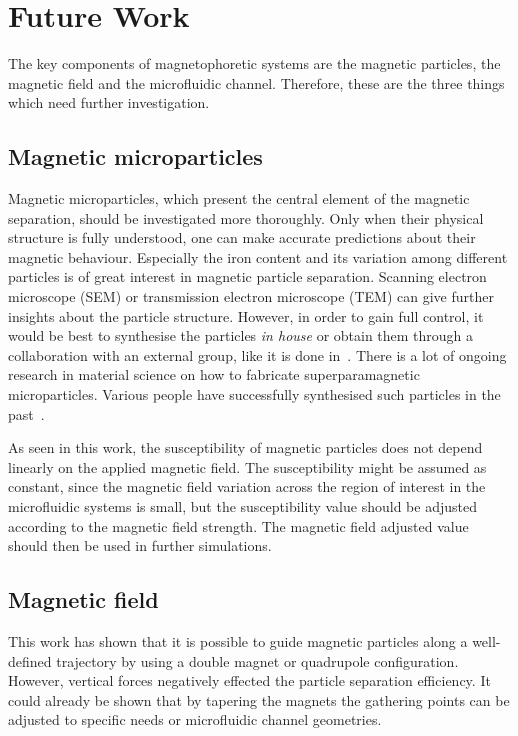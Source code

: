 \section{Future Work}\label{sec:futureWork}

The key components of magnetophoretic systems are the magnetic particles, the magnetic field and the microfluidic channel. Therefore, these are the three things which need further investigation.

\subsection{Magnetic microparticles}
Magnetic microparticles, which present the central element of the magnetic separation, should be investigated more thoroughly. Only when their physical structure is fully understood, one can make accurate predictions about their magnetic behaviour. Especially the iron content and its variation among different particles is of great interest in magnetic particle separation. Scanning electron microscope (SEM) or transmission electron microscope (TEM) can give further insights about the particle structure. However, in order to gain full control, it would be best to synthesise the particles \textit{in house} or obtain them through a collaboration with an external group, like it is done in~\cite{Zborowski2002}. There is a lot of ongoing research in material science on how to fabricate superparamagnetic microparticles. Various people have successfully synthesised such particles in the past~\cite{Ma2003,Liu2003,Liu2004}.

As seen in this work, the susceptibility of magnetic particles does not depend linearly on the applied magnetic field. The susceptibility might be assumed as constant, since the magnetic field variation across the region of interest in the microfluidic systems is small, but the susceptibility value should be adjusted according to the magnetic field strength. The magnetic field adjusted value should then be used in further simulations.

\subsection{Magnetic field}
This work has shown that it is possible to guide magnetic particles along a well-defined trajectory by using a double magnet or quadrupole configuration. However, vertical forces negatively effected the particle separation efficiency. It could already be shown that by tapering the magnets the gathering points can be adjusted to specific needs or microfluidic channel geometries.

